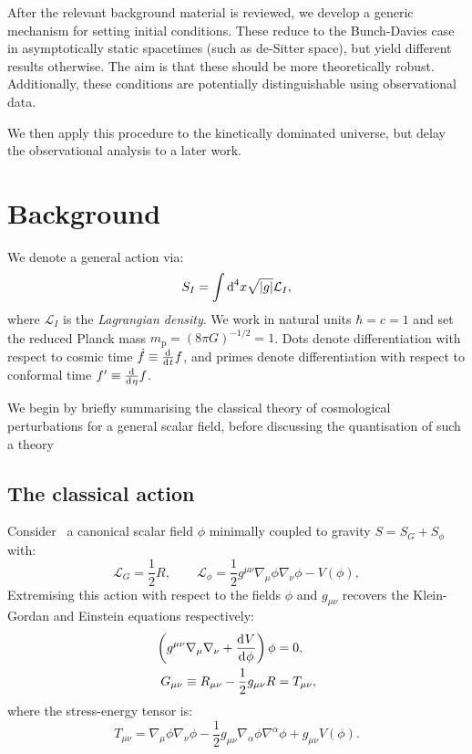 After the relevant background material is reviewed, we develop a generic mechanism for setting initial conditions. These reduce to the Bunch-Davies case in asymptotically static spacetimes (such as de-Sitter space), but yield different results otherwise. The aim is that these should be more theoretically robust. Additionally, these conditions are potentially distinguishable using observational data.

We then apply this procedure to the kinetically dominated universe, but delay the observational analysis to a later work.



\section{Background}
\label{sec:background}

We denote a general action via:
\begin{equation}
  S_I = \int \d[4]{x}\sqrt{|g|}\mathcal{L}_I,
  \label{eqn:general_action}
\end{equation}
where $\mathcal{L}_I$ is the {\em Lagrangian density}. We work in natural units $\hbar=c=1$ and set the reduced Planck mass $m_\mathrm{p} = {(8\pi G)}^{-1/2} = 1$. Dots denote differentiation with respect to cosmic time $\dot{f}\equiv \frac{\operatorname{d}^{}\!{}}{\operatorname{d}^{}\!{t}}f$, and primes denote differentiation with respect to conformal time ${{f}^\prime}\equiv\frac{\operatorname{d}^{}\!{}}{\operatorname{d}^{}\!{\eta}}f$.

We begin by briefly summarising the classical theory of cosmological perturbations for a general scalar field, before discussing the quantisation of such a theory


\subsection{The classical action}
\label{sec:inflation}
Consider~\cite{Baumann+2009} a canonical scalar field $\phi$ minimally coupled to gravity $S= S_G + S_\phi$ with:
\begin{equation}
  \mathcal{L}_G = \frac{1}{2}R, 
  \qquad
  \mathcal{L}_\phi = \frac{1}{2}g^{\mu\nu}\nabla_\mu\phi\nabla_\nu\phi - V(\phi),
  \label{eqn:action}
\end{equation}
Extremising this action with respect to the fields $\phi$ and $g_{\mu\nu}$ recovers the Klein-Gordan and Einstein equations respectively:
\begin{align}
  \left( g^{\mu\nu}\nabla_\mu\nabla_\nu + \frac{\d{V}}{\d{\phi}} \right) \phi &= 0,
  \label{eqn:klein_gordon}\\
  G_{\mu\nu}\equiv R_{\mu\nu}-\frac{1}{2}g_{\mu\nu}R&= T_{\mu\nu},
  \label{eqn:einstein}
\end{align}
where the stress-energy tensor is:
\begin{equation}
  T_{\mu\nu} = \nabla_\mu\phi \nabla_\nu\phi - \frac{1}{2}g_{\mu\nu} \nabla_\alpha\phi \nabla^\alpha\phi +g_{\mu\nu} V(\phi).
  \label{eqn:SET}
\end{equation}

